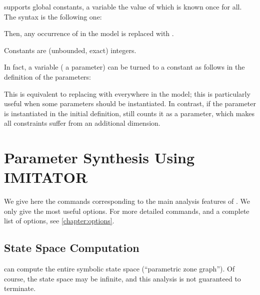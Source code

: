 \imitator{} supports global constants, \ie{} a variable the value of which is known once for all.
The syntax is the following one:
	\begin{center}
	\end{center}
Then, any occurrence of  in the model is replaced with .

Constants are (unbounded, exact) integers.


\begin{hint}
	In fact, a variable (\eg{} a parameter) can be turned to a constant as follows in the definition of the parameters:
	\begin{center}
	\end{center}
	This is equivalent to replacing  with  everywhere in the model; this is particularly useful when some parameters should be instantiated.
	In contrast, if the parameter is instantiated in the initial definition, \imitator{} still counts it as a parameter, which makes all constraints suffer from an additional dimension.
\end{hint}





\chapter{Parameter Synthesis Using IMITATOR}


We give here the commands corresponding to the main analysis features of \imitator{}.
We only give the most useful options.
For more detailed commands, and a complete list of options, see \cref{chapter:options}.


\section{State Space Computation}\label{ss:mode:statespace}

\imitator{} can compute the entire symbolic state space (``parametric zone graph'').
Of course, the state space may be infinite, and this analysis is not guaranteed to terminate.

